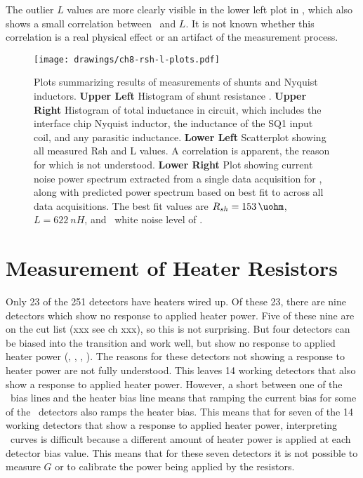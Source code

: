 The outlier $L$ values are more clearly visible in the lower left plot in , which also shows a small correlation between \Rsh\ and $L$.
It is not known whether this correlation is a real physical effect or an artifact of the measurement process.

\begin{figure*}
\texttt{[image: drawings/ch8-rsh-l-plots.pdf]}
\caption{Plots summarizing results of measurements of shunts and Nyquist inductors.
\textbf{Upper Left} Histogram of shunt resistance \Rsh.
\textbf{Upper Right} Histogram of total inductance in circuit, which includes the interface chip Nyquist inductor, the inductance of the SQ1 input coil, and any parasitic inductance.
\textbf{Lower Left} Scatterplot showing all measured Rsh and L values. A correlation is apparent, the reason for which is not understood.
\textbf{Lower Right} Plot showing current noise power spectrum extracted from a single data acquisition for , along with predicted power spectrum based on best fit to  across all data acquisitions. The best fit values are $\Rsh=\SI{153}{\uohm}$, $L = \SI{622}{nH}$, and \SQUID\ white noise level of .}
\label{fig:rsh-l-plots}
\end{figure*}

\section{Measurement of Heater Resistors}

Only 23 of the 251 detectors have heaters wired up.
Of these 23, there are nine detectors which show no response to applied heater power.
Five of these nine are on the cut list (xxx see ch xxx), so this is not surprising.
But four detectors can be biased into the transition and work well, but show no response to applied heater power (, , , ).
The reasons for these detectors not showing a response to heater power are not fully understood.
This leaves 14 working detectors that also show a response to applied heater power.
However, a short between one of the \TES\ bias lines and the heater bias line means that ramping the current bias for some of the \TES\ detectors also ramps the heater bias.
This means that for seven of the 14 working detectors that show a response to applied heater power, interpreting \IV\ curves is difficult because a different amount of heater power is applied at each detector bias value.
This means that for these seven detectors it is not possible to measure $G$ or to calibrate the power being applied by the resistors.

